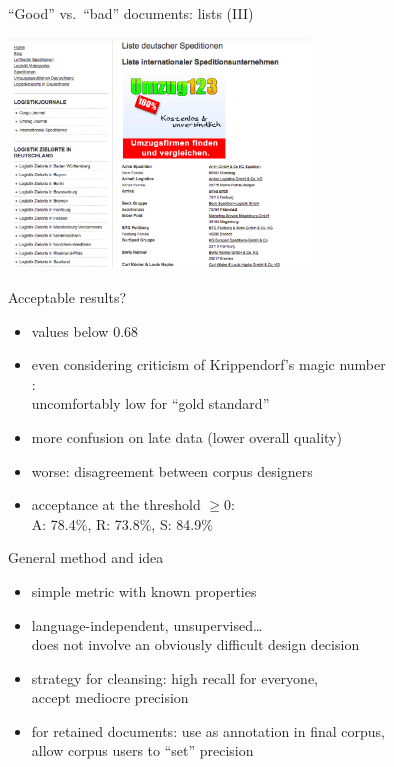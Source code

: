 \begin{frame}{``Good'' vs.\ ``bad'' documents: lists (III)}

   \begin{center}
    \includegraphics[width=8cm]{graphicswcc/spedition}
  \end{center}

\end{frame}


\begin{frame}
  {Acceptable results?}
  \begin{itemize}
    \item \alert{values below $0.68$ \citep{Krippendorff1980}}
    \item even considering criticism of Krippendorf's magic number\\
      \citep{Carletta1996,BayerlPaul2011}:\\
      \alert{uncomfortably low for ``gold standard''}
    \item more confusion on late data (lower overall quality)
    \item worse: disagreement between corpus designers
    \item acceptance at the threshold $\geq 0$:\\
      A: 78.4\%, R: 73.8\%, S: 84.9\%
  \end{itemize}
\end{frame}


\begin{frame}
  {General method and idea}
  \begin{itemize}
    \item simple metric with known properties
    \item language-independent, unsupervised\ldots\\
      \alert{does not involve an obviously difficult design decision}
    \item strategy for cleansing: \alert{high recall for everyone},\\
      accept mediocre precision
    \item for retained documents: use as annotation in final corpus,\\
      \alert{allow corpus users to ``set'' precision}
  \end{itemize}
\end{frame}


